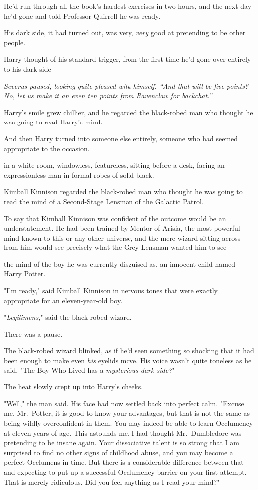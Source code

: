 He'd run through all the book's hardest exercises in two hours, and the next
day he'd gone and told Professor Quirrell he was ready.

His dark side, it had turned out, was very, \emph{very} good at pretending to
be other people.

Harry thought of his standard trigger, from the first time he'd gone over
entirely to his dark side{\el}

\emph{Severus paused, looking quite pleased with himself. ``And that will
be{\el} five points? No, let us make it an even ten points from Ravenclaw
for backchat.''}

Harry's smile grew chillier, and he regarded the black-robed man who thought he
was going to read Harry's mind.

And then Harry turned into someone else entirely, someone who had seemed
appropriate to the occasion.

{\el} in a white room, windowless, featureless, sitting before a desk, facing
an expressionless man in formal robes of solid black.

Kimball Kinnison regarded the black-robed man who thought he was going to read
the mind of a Second-Stage Lensman of the Galactic Patrol.

To say that Kimball Kinnison was confident of the outcome would be an
understatement. He had been trained by Mentor of Arisia, the most powerful mind
known to this or any other universe, and the mere wizard sitting across from
him would see precisely what the Grey Lensman wanted him to see{\el}

{\el} the mind of the boy he was currently disguised as, an innocent child
named Harry Potter.

"I'm ready," said Kimball Kinnison in nervous tones that were exactly
appropriate for an eleven-year-old boy.

"\emph{Legilimens,}" said the black-robed wizard.

There was a pause.

The black-robed wizard blinked, as if he'd seen something so shocking that it
had been enough to make even \emph{his} eyelids move. His voice wasn't quite
toneless as he said, "The Boy-Who-Lived has a \emph{mysterious dark side?}"

The heat slowly crept up into Harry's cheeks.

"Well," the man said. His face had now settled back into perfect calm. "Excuse
me. Mr.~Potter, it is good to know your advantages, but that is not the same as
being wildly overconfident in them. You may indeed be able to learn Occlumency
at eleven years of age. This astounds me. I had thought Mr.~Dumbledore was
pretending to be insane again. Your dissociative talent is so strong that I am
surprised to find no other signs of childhood abuse, and you may become a
perfect Occlumens in time. But there is a considerable difference between that
and expecting to put up a successful Occlumency barrier on your first attempt.
That is merely ridiculous. Did you feel anything as I read your mind?"

